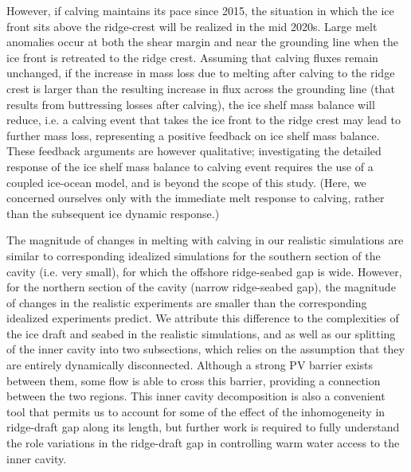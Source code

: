 \documentclass[draft]{agujournal2019}
\begin{document}
However, if calving maintains its pace since 2015, the situation in which the ice front sits above the ridge-crest will be realized in the mid 2020s. Large melt anomalies occur at both the shear margin and near the grounding line when the ice front is retreated to the ridge crest. Assuming that calving fluxes remain unchanged, if the increase in mass loss due to melting after calving to the ridge crest is larger than the resulting increase in flux across the grounding line (that results from buttressing losses after calving), the ice shelf mass balance will reduce, i.e. a calving event that takes the ice front to the ridge crest may lead to further mass loss, representing a positive feedback on ice shelf mass balance. These feedback arguments are however qualitative; investigating the detailed response of the ice shelf mass balance to calving event requires the use of a coupled ice-ocean model, and is beyond the scope of this study. (Here, we concerned ourselves only with the immediate melt response to calving, rather than the subsequent ice dynamic response.)



The magnitude of changes in melting with calving in our realistic simulations are similar to corresponding idealized simulations for the southern section of the cavity (i.e. very small), for which the offshore ridge-seabed gap is wide. However, for the northern section of the cavity (narrow ridge-seabed gap), the magnitude of changes in the realistic experiments are smaller than the corresponding idealized experiments predict. We attribute this difference to the complexities of the ice draft and seabed in the realistic simulations, and as well as our splitting of the inner cavity into two subsections, which relies on the assumption that they are entirely dynamically disconnected. Although a strong PV barrier exists between them, some flow is able to cross this barrier, providing a connection between the two regions. This inner cavity decomposition is also a convenient tool that permits us to account for some of the effect of the inhomogeneity in ridge-draft gap along its length, but further work is required to fully understand the role variations in the ridge-draft gap in controlling warm water access to the inner cavity. 
\end{document}
